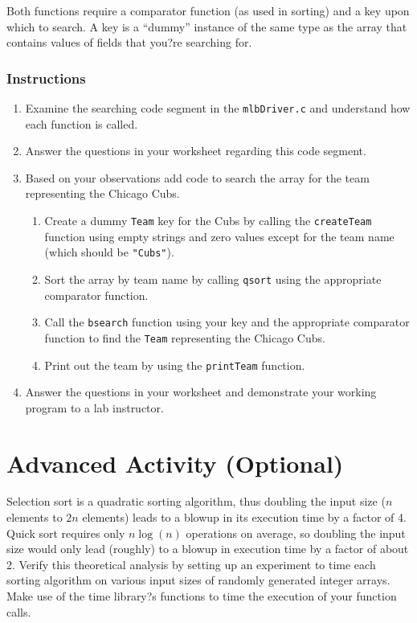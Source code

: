 \documentclass[12pt]{scrartcl}
\begin{document}
Both functions require a comparator function (as used in sorting) and a 
key upon which to search.  A key is a ``dummy'' instance of the same type 
as the array that contains values of fields that you?re searching for.

\subsubsection*{Instructions}

\begin{enumerate}
  \item Examine the searching code segment in the \texttt{mlbDriver.c} 
	and understand how each function is called.  
  \item Answer the questions in your worksheet regarding this code segment.
  \item Based on your observations add code to search the array for the 
	team representing the Chicago Cubs.
  \begin{enumerate}
    \item Create a dummy \texttt{Team} key for the Cubs by 
    calling the \texttt{createTeam} function using empty strings and 
    zero values except for the team name (which should be \texttt{"Cubs"}).
    \item Sort the array by team name by calling \texttt{qsort} using 
    the appropriate comparator function.
    \item Call the \texttt{bsearch} function using your key and the 
    appropriate comparator function to find the \texttt{Team} representing 
    the Chicago Cubs.
    \item Print out the team by using the \texttt{printTeam} function.
  \end{enumerate}
  \item Answer the questions in your worksheet and demonstrate your 
    working program to a lab instructor.
\end{enumerate}

\section{Advanced Activity (Optional)}

Selection sort is a quadratic sorting algorithm, thus doubling the input size 
($n$ elements to $2n$ elements) leads to a blowup in its execution time 
by a factor of 4.  Quick sort requires only $n\log(n)$ operations on average, 
so doubling the input size would only lead (roughly) to a blowup in execution 
time by a factor of about 2.  Verify this theoretical analysis by setting up an 
experiment to time each sorting algorithm on various input sizes of randomly 
generated integer arrays.  Make use of the time library?s functions to time 
the execution of your function calls.  
	
\end{document}
